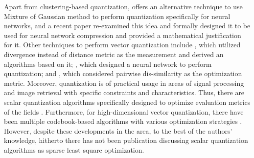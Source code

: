 \documentclass[preprint,10pt]{elsarticle}
\begin{document}
Apart from clustering-based quantization, \cite{1992weightsharing} offers an alternative technique to use Mixture of Gaussian method to perform quantization specifically for neural networks, and a recent paper \cite{2017_compression_1992idea} re-examined this idea and formally designed it to be used for neural network compression and provided a mathematical justification for it. Other techniques to perform vector quantization include \cite{DivergenceQuantization}, which utilized divergence instead of distance metric as the measurement and derived an algorithms based on it; \cite{UseNeuralNetworkToQuantize}, which designed a neural network to perform quantization; and \cite{PairwiseSimilarityQuantization}, which considered pairwise dis-similarity as the optimization metric. Moreover, quantization is of practical usage in areas of signal processing and image retrieval with specific constraints and characteristics. Thus, there are scalar quantization algorithms specifically designed to optimize evaluation metrics of the fields \cite{boufounos2012QuantizationForSignalProcessing,zhou2016QuantizationForImageRetrieval}. Furthermore, for high-dimensional vector quantization, there have been multiple codebook-based algorithms with various optimization strategies \cite{ai2017ResidualVectorQuant,ozan2016CompetitiveVectorQuant}. However, despite these developments in the area, to the best of the authors' knowledge, hitherto there has not been publication discussing scalar quantization algorithms as sparse least square optimization. \par
\end{document}
